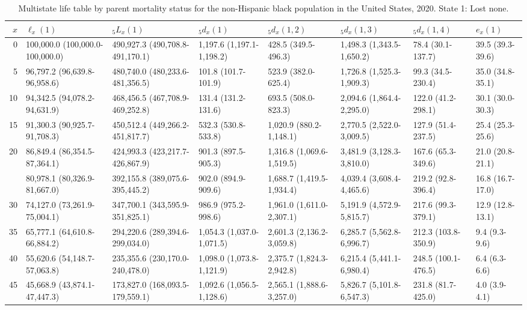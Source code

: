 \begin{table}

\caption{Multistate life table by parent mortality status for the non-Hispanic black population in the United States, 2020. State 1: Lost none.}
\centering
\begin{tabular}[t]{rlllllll}
\toprule
$x$ & $\ell_x(1)$ & ${}_5 L_x(1)$ & ${}_5 d_x(1)$ & ${}_5 d_x(1,2)$ & ${}_5 d_x(1,3)$ & ${}_5 d_x(1,4)$ & $e_x(1)$\\
\midrule
0 & 100,000.0 (100,000.0-100,000.0) & 490,927.3 (490,708.8-491,170.1) & 1,197.6 (1,197.1-1,198.2) & 428.5 (349.5-496.3) & 1,498.3 (1,343.5-1,650.2) & 78.4 (30.1-137.7) & 39.5 (39.3-39.6)\\
5 & 96,797.2 (96,639.8-96,958.6) & 480,740.0 (480,233.6-481,356.5) & 101.8 (101.7-101.9) & 523.9 (382.0-625.4) & 1,726.8 (1,525.3-1,909.3) & 99.3 (34.5-230.4) & 35.0 (34.8-35.1)\\
10 & 94,342.5 (94,078.2-94,631.9) & 468,456.5 (467,708.9-469,252.8) & 131.4 (131.2-131.6) & 693.5 (508.0-823.3) & 2,094.6 (1,864.4-2,295.0) & 122.0 (41.2-298.1) & 30.1 (30.0-30.3)\\
15 & 91,300.3 (90,925.7-91,708.3) & 450,512.4 (449,266.2-451,817.7) & 532.3 (530.8-533.8) & 1,020.9 (880.2-1,148.1) & 2,770.5 (2,522.0-3,009.5) & 127.9 (51.4-237.5) & 25.4 (25.3-25.6)\\
20 & 86,849.4 (86,354.5-87,364.1) & 424,993.3 (423,217.7-426,867.9) & 901.3 (897.5-905.3) & 1,316.8 (1,069.6-1,519.5) & 3,481.9 (3,128.3-3,810.0) & 167.6 (65.3-349.6) & 21.0 (20.8-21.1)\\
\addlinespace
25 & 80,978.1 (80,326.9-81,667.0) & 392,155.8 (389,075.6-395,445.2) & 902.0 (894.9-909.6) & 1,688.7 (1,419.5-1,934.4) & 4,039.4 (3,608.4-4,465.6) & 219.2 (92.8-396.4) & 16.8 (16.7-17.0)\\
30 & 74,127.0 (73,261.9-75,004.1) & 347,700.1 (343,595.9-351,825.1) & 986.9 (975.2-998.6) & 1,961.0 (1,611.0-2,307.1) & 5,191.9 (4,572.9-5,815.7) & 217.6 (99.3-379.1) & 12.9 (12.8-13.1)\\
35 & 65,777.1 (64,610.8-66,884.2) & 294,220.6 (289,394.6-299,034.0) & 1,054.3 (1,037.0-1,071.5) & 2,601.3 (2,136.2-3,059.8) & 6,285.7 (5,562.8-6,996.7) & 212.3 (103.8-350.9) & 9.4 (9.3-9.6)\\
40 & 55,620.6 (54,148.7-57,063.8) & 235,355.6 (230,170.0-240,478.0) & 1,098.0 (1,073.8-1,121.9) & 2,375.7 (1,824.3-2,942.8) & 6,215.4 (5,441.1-6,980.4) & 248.5 (100.1-476.5) & 6.4 (6.3-6.6)\\
45 & 45,668.9 (43,874.1-47,447.3) & 173,827.0 (168,093.5-179,559.1) & 1,092.6 (1,056.5-1,128.6) & 2,565.1 (1,888.6-3,257.0) & 5,826.7 (5,101.8-6,547.3) & 231.8 (81.7-425.0) & 4.0 (3.9-4.1)\\

\end{tabular}
\end{table}
